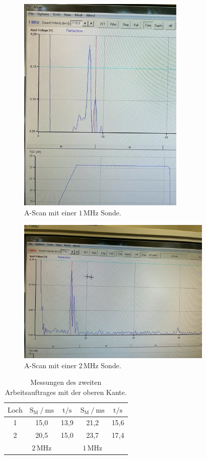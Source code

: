 \begin{figure}[H]
    \centering
    \includegraphics[width=80mm]{bilder/1.jpeg}
    \caption{A-Scan mit einer $ 1\,\unit{\mega\hertz} $ Sonde.\label{Abbildung5} }
\end{figure}

\begin{figure}[H]      
    \centering
    \includegraphics[height=70mm]{bilder/A2 2megahertz.jpeg}
    \caption{A-Scan mit einer $ 2\,\unit{\mega\hertz} $ Sonde.\label{Abbildung2} }
\end{figure}

\begin{table}[H]
    \centering
    \caption{Messungen des zweiten Arbeitsauftrages mit der oberen Kante.} 
    \label{Tabelle4}
    \begin{tabular} {c || c  c || c  c}
        \toprule
        {$ \text{Loch} $} &
        {$ \text{S}_{\text{M}} \mathbin{/} \unit{\milli\second} $} &
        {$ \text{t} \mathbin{/} \unit{\second} $} &
        {$ \text{S}_{\text{M}} \mathbin{/} \unit{\milli\second} $} &
        {$ \text{t} \mathbin{/} \unit{\second} $} \\
        \midrule
        1 & 15,0 & 13,9 & 21,2 & 15,6 \\
        2 & 20,5 & 15,0 & 23,7 & 17,4 \\
        \bottomrule
        {} &
        {$ 2\,\unit{\mega\hertz} $} &
        {} &
        {$ 1\,\unit{\mega\hertz} $} &
        {} \\
    \end{tabular} 
\end{table}

